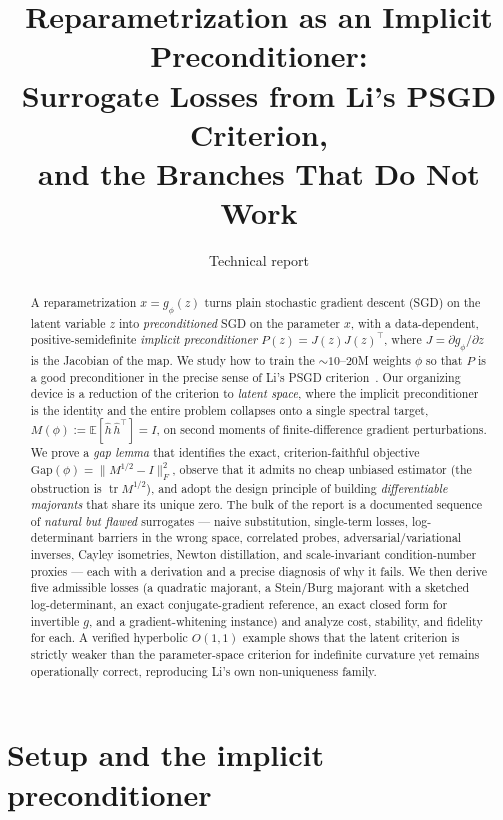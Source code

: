 \documentclass[11pt]{article}
\title{\bf Reparametrization as an Implicit Preconditioner:\\
Surrogate Losses from Li's PSGD Criterion,\\ and the Branches That Do Not Work}
\author{Technical report}
\date{}
\theoremstyle{plain}
\theoremstyle{definition}
\theoremstyle{remark}
\DeclareMathOperator{\tr}{tr}
\newcommand{\E}{\mathbb{E}}
\newcommand{\Fnorm}[1]{\lVert #1 \rVert_F}
\newcommand{\hh}{\hat{h}}
\begin{document}
\maketitle

\begin{abstract}
\noindent
A reparametrization $x=g_\phi(z)$ turns plain stochastic gradient descent (SGD) on the
latent variable $z$ into \emph{preconditioned} SGD on the parameter $x$, with a
data-dependent, positive-semidefinite \emph{implicit preconditioner}
$P(z)=J(z)J(z)^{\!\top}$, where $J=\partial g_\phi/\partial z$ is the Jacobian of the map.
We study how to train the $\sim\!10$--$20$M weights $\phi$ so that $P$ is a good
preconditioner in the precise sense of Li's PSGD criterion~\cite{li2015}. Our organizing
device is a reduction of the criterion to \emph{latent space}, where the implicit
preconditioner is the identity and the entire problem collapses onto a single spectral
target, $M(\phi):=\E[\hh\,\hh^{\!\top}]=I$, on second moments of finite-difference
gradient perturbations. We prove a \emph{gap lemma} that identifies the exact,
criterion-faithful objective $\mathrm{Gap}(\phi)=\Fnorm{M^{1/2}-I}^2$, observe that it
admits no cheap unbiased estimator (the obstruction is $\tr M^{1/2}$), and adopt the
design principle of building \emph{differentiable majorants} that share its unique zero.
The bulk of the report is a documented sequence of \emph{natural but flawed} surrogates
--- naive substitution, single-term losses, log-determinant barriers in the wrong space,
correlated probes, adversarial/variational inverses, Cayley isometries, Newton
distillation, and scale-invariant condition-number proxies --- each with a derivation and
a precise diagnosis of why it fails. We then derive five admissible losses (a quadratic
majorant, a Stein/Burg majorant with a sketched log-determinant, an exact
conjugate-gradient reference, an exact closed form for invertible $g$, and a
gradient-whitening instance) and analyze cost, stability, and fidelity for each. A
verified hyperbolic $O(1,1)$ example shows that the latent criterion is strictly weaker
than the parameter-space criterion for indefinite curvature yet remains operationally
correct, reproducing Li's own non-uniqueness family.
\end{abstract}

\tableofcontents
\bigskip

\section{Setup and the implicit preconditioner}
\label{sec:setup}
\end{document}
